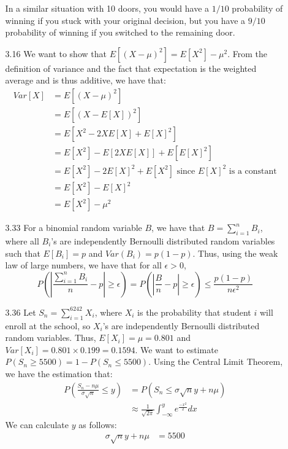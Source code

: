 \documentclass[letterpaper,12pt]{article}
\theoremstyle{definition}
\begin{document}
\begin{enumerate}
\begin{enumerate}
      In a similar situation with 10 doors, you would have a $1/10$ probability of winning if you stuck with your original decision, but you have a $9/10$ probability of winning if you switched to the remaining door.
    \item[3.16]
      We want to show that $E[(X-\mu)^2] = E[X^2] - \mu^2$. From the definition of variance and the fact that expectation is the weighted average and is thus additive, we have that:
        \begin{align*}
          Var[X] &= E[(X-\mu)^2] \\
          &= E[(X-E[X])^2] \\
          &= E[X^2 - 2XE[X] + E[X]^2] \\
          &= E[X^2] - E[2XE[X]] + E[E[X]^2] \\
          &= E[X^2] - 2E[X]^2 + E[X^2] \text{ since $E[X]^2$ is a constant} \\
          &= E[X^2] - E[X]^2 \\
          &= E[X^2] - \mu^2
        \end{align*}
    \item[3.33]
      For a binomial random variable $B$, we have that $B = \sum_{i=1}^n B_i$, where all $B_i$'s are independently Bernoulli distributed random variables such that $E[B_i] = p$ and $Var(B_i) = p(1-p)$. Thus, using the weak law of large numbers, we have that for all $\epsilon > 0$,
        \begin{equation*}
          P(|\frac{\sum_{i=1}^n B_i}{n} - p| \geq \epsilon) = P(|\frac{B}{n} - p| \geq \epsilon) \leq \frac{p(1-p)}{n\epsilon^2}
        \end{equation*}
    \item[3.36]
      Let $S_n = \sum_{i=1}^{6242} X_i$, where $X_i$ is the probability that student $i$ will enroll at the school, so $X_i$'s are independently Bernoulli distributed random variables. Thus, $E[X_i]=\mu = 0.801$ and $Var[X_i] = 0.801 \times 0.199 = 0.1594$. We want to estimate $P(S_n \geq 5500) = 1 - P(S_n \leq 5500)$. Using the Central Limit Theorem, we have the estimation that:
        \begin{align*}
          P(\frac{S_n - n\mu}{\sigma\sqrt{n}} \leq y) &= P(S_n \leq \sigma\sqrt{n}y + n\mu) \\
          & \approx \frac{1}{\sqrt{2\pi}}\int_{-\infty}^y e^{\frac{-x^2}{2}}dx
        \end{align*}
      We can calculate $y$ as follows:
        \begin{align*}
          \sigma\sqrt{n}y + n\mu &= 5500 \\

\end{align*}
\end{enumerate}
\end{enumerate}
\end{document}
